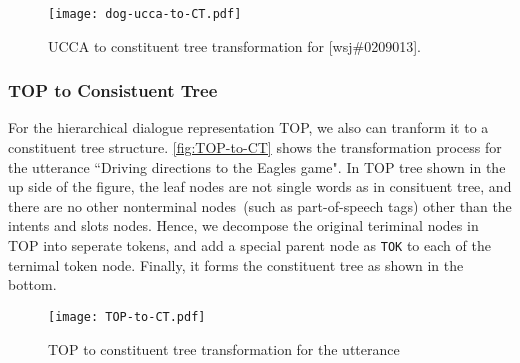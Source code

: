 \begin{figure}[!h]
\begin{center}
\texttt{[image: dog-ucca-to-CT.pdf]}
\end{center}
\caption{\label{fig:ucca-to-CT} UCCA to constituent tree transformation for [wsj\#0209013].}
\end{figure}

\subsubsection{TOP to Consistuent Tree}
\label{sssec:phr:top-to-ct}
For the hierarchical dialogue representation TOP, we also can tranform
it to a constituent tree structure. \autoref{fig:TOP-to-CT} shows the
transformation process for the utterance ``Driving directions to the
Eagles game". In TOP tree shown in the up side of the figure, the leaf
nodes are not single words as in consituent tree, and there are no
other nonterminal nodes~(such as part-of-speech tags) other than the
intents and slots nodes. Hence, we decompose the original teriminal
nodes in TOP into seperate tokens, and add a special parent node as
\texttt{TOK} to each of the ternimal token node. Finally, it forms the
constituent tree as shown in the bottom.
\begin{figure}[!h]
\begin{center}
\texttt{[image: TOP-to-CT.pdf]}
\end{center}
\caption{\label{fig:TOP-to-CT} TOP to constituent tree transformation
  for the utterance }
\end{figure}

